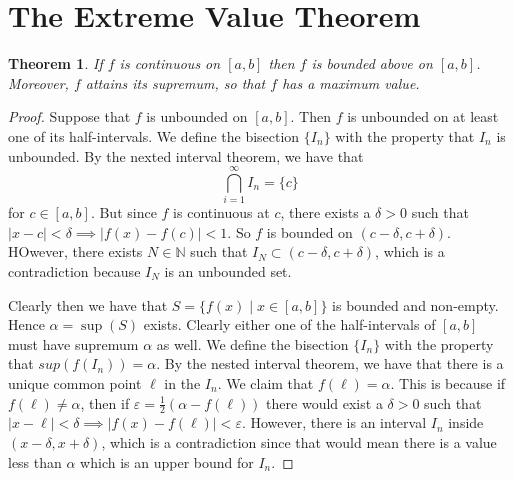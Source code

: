 \documentclass[12pt]{article}
\theoremstyle{definition}
\theoremstyle{plain}
\newtheorem{thm}{Theorem}
\begin{document}
\section{The Extreme Value Theorem}

\begin{thm}
If $f$ is continuous on $[a, b]$ then $f$ is bounded above on $[a, b]$. Moreover, $f$ attains its supremum, so that $f$ has a maximum value.
\end{thm}

\begin{proof}
Suppose that $f$ is unbounded on $[a, b]$. Then $f$ is unbounded on at least one of its half-intervals. We define the bisection $\{I_n\}$ with the property that $I_n$ is unbounded. By the nexted interval theorem, we have that 
\[\bigcap_{i = 1}^{\infty}I_n = \{c\}\] for $c \in [a, b]$. But since $f$ is continuous at $c$, there exists a $\delta > 0$ such that $|x - c| < \delta \implies |f(x) - f(c)| < 1$. So $f$ is bounded on $(c - \delta, c + \delta)$. HOwever, there exists $N \in \mathbb{N}$ such that $I_N \subset (c - \delta, c + \delta)$, which is a contradiction because $I_N$ is an unbounded set.

Clearly then we have that $S = \{f(x) \mid x \in [a,b]\}$ is bounded and non-empty. Hence $\alpha = \sup(S)$ exists. Clearly either one of the half-intervals of $[a, b]$ must have supremum $\alpha$ as well. We define the bisection $\{I_n\}$ with the property that $sup(f(I_n)) = \alpha$. By the nested interval theorem, we have that there is a unique common point $\ell$ in the $I_n$. We claim that $f(\ell) = \alpha$. This is because if $f(\ell) \neq \alpha$, then if $\varepsilon = \frac{1}{2}(\alpha - f(\ell))$ there would exist a $\delta > 0$ such that $|x - \ell| < \delta \implies |f(x) - f(\ell)| < \varepsilon$. However, there is an interval $I_n$ inside $(x - \delta, x + \delta)$, which is a contradiction since that would mean there is a value less than $\alpha$ which is an upper bound for $I_n$.
\end{proof}
\end{document}
